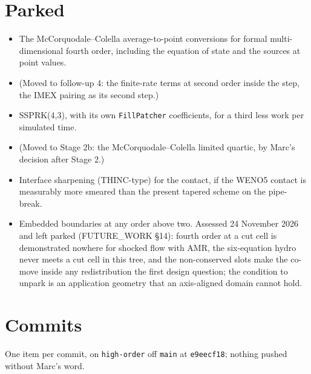 \documentclass[11pt,a4paper]{article}
\newcommand{\code}[1]{\texttt{\small #1}}
\begin{document}
\section{Parked}
\label{sec:parked}

\begin{itemize}[nosep]
\item The McCorquodale--Colella average-to-point conversions for formal
      multi-dimensional fourth order, including the equation of state and
      the sources at point values.
\item (Moved to follow-up 4: the finite-rate terms at second order
      inside the step, the IMEX pairing as its second step.)
\item SSPRK(4,3), with its own \code{FillPatcher} coefficients, for a third
      less work per simulated time.
\item (Moved to Stage 2b: the McCorquodale--Colella limited quartic, by
      Marc's decision after Stage 2.)
\item Interface sharpening (THINC-type) for the contact, if the WENO5
      contact is measurably more smeared than the present tapered scheme on
      the pipe-break.
\item Embedded boundaries at any order above two.  Assessed 24 November
      2026 and left parked (FUTURE\_WORK \S14): fourth order at a cut cell is
      demonstrated nowhere for shocked flow with AMR, the six-equation hydro
      never meets a cut cell in this tree, and the non-conserved slots make
      the co-move inside any redistribution the first design question; the
      condition to unpark is an application geometry that an axis-aligned
      domain cannot hold.
\end{itemize}

\section{Commits}
\label{sec:commits}

One item per commit, on \code{high-order} off \code{main} at
\code{e9eecf18}; nothing pushed without Marc's word.
\end{document}
